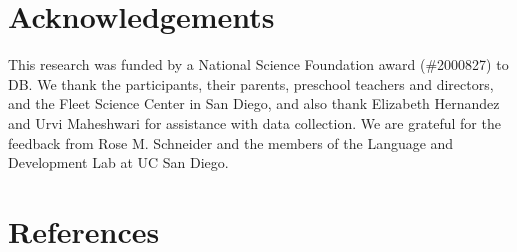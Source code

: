 \documentclass[10pt, letterpaper]{article}
\begin{document}
\hypertarget{acknowledgements}{%
\section{Acknowledgements}\label{acknowledgements}}

This research was funded by a National Science Foundation award
(\#2000827) to DB. We thank the participants, their parents, preschool
teachers and directors, and the Fleet Science Center in San Diego, and
also thank Elizabeth Hernandez and Urvi Maheshwari for assistance with
data collection. We are grateful for the feedback from Rose M. Schneider
and the members of the Language and Development Lab at UC San Diego.

\hypertarget{references}{%
\section{References}\label{references}}

\setlength{\parindent}{-0.1in} 
\setlength{\leftskip}{0.125in}

\noindent
\end{document}
